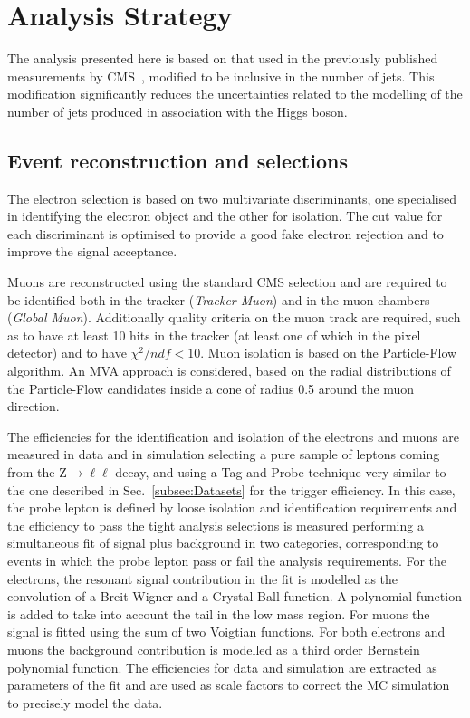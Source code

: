 \section{Analysis Strategy}
\label{sec:AnalysisStrategy}

The analysis presented here is based on that used in the previously published \hwwllnn{}
measurements by CMS~\cite{Chatrchyan:2013iaa}, modified to be inclusive in the number of jets. 
This modification significantly reduces the uncertainties related to the modelling of the number of jets produced in association with the Higgs boson.


\subsection{Event reconstruction and selections}\label{sec:Selections}


The electron selection is based on two multivariate discriminants, one specialised in identifying the electron object and the other for isolation. The cut value for each discriminant is optimised to provide a good fake electron rejection and to improve the signal acceptance.

Muons are reconstructed using the standard CMS selection and are required to be identified both in the tracker (\textit{Tracker Muon}) and in the muon chambers (\textit{Global Muon}). Additionally quality criteria on the muon track are required, such as to have at least 10 hits in the tracker (at least one of which in the pixel detector) and to have $\chi^2/ndf < 10$.
Muon isolation is based on the Particle-Flow algorithm. An MVA approach is considered, based on the radial distributions of the Particle-Flow candidates inside a cone of radius 0.5 around the muon direction.

The efficiencies for the identification and isolation of the electrons and muons are measured in data and in simulation selecting a pure sample of leptons coming from the Z$\to\ell\ell$ decay, and using a Tag and Probe technique very similar to the one described in Sec.~\ref{subsec:Datasets} for the trigger efficiency. In this case, the probe lepton is defined by loose isolation and identification requirements and the efficiency to pass the tight analysis selections is measured performing a simultaneous fit of signal plus background in two categories, corresponding to events in which the probe lepton pass or fail the analysis requirements. For the electrons, the resonant signal contribution in the fit is modelled as the convolution of a Breit-Wigner and a Crystal-Ball function. A polynomial function is added to take into account the tail in the low mass region. For muons the signal is fitted using the sum of two Voigtian functions. For both electrons and muons the background contribution is modelled as a third order Bernstein polynomial function.
The efficiencies for data and simulation are extracted as parameters of the fit and are used as scale factors to correct the MC simulation to precisely model the data.

